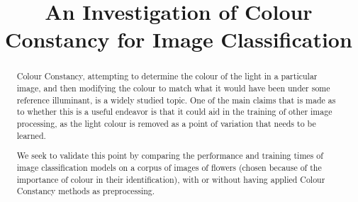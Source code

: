 \documentclass{bmvc2k}
\title{An Investigation of Colour Constancy for Image Classification}
\begin{document}
\maketitle

\begin{abstract}
Colour Constancy, attempting to determine the colour of the light in a particular image, and then 
modifying the colour to match what it would have been under some reference illuminant, is a widely studied topic.
One of the main claims that is made as to whether this is a useful endeavor is that it could aid in the training
of other image processing, as the light colour is removed as a point of variation that needs to be learned.

We seek to validate this point by comparing the performance and training times of image classification models on 
a corpus of images of flowers (chosen because of the importance of colour in their identification), with or without
having applied Colour Constancy methods as preprocessing.
\end{abstract}





\end{document}
